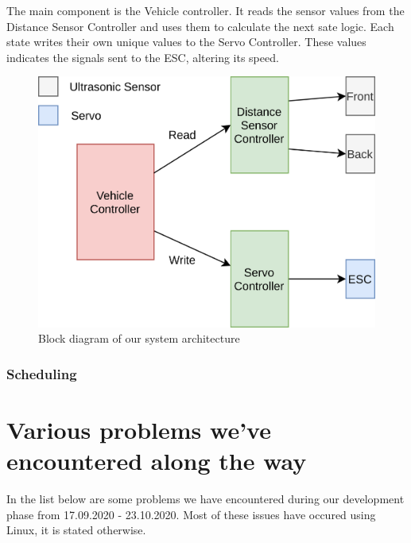 \documentclass{article}
\begin{document}
The main component is the Vehicle controller. It reads the sensor values from the Distance Sensor Controller and uses them to calculate the next sate logic. Each state writes their own unique values to the Servo Controller. These values indicates the signals sent to the ESC, altering its speed.

\begin{figure}[H]
	\centering
	\includegraphics[width=\linewidth]{system-architecture.png}
	\caption{Block diagram of our system architecture}
	\label{SystemArchBlock}
\end{figure}

\subsubsection{Scheduling}

\section{Various problems we've encountered along the way}
In the list below are some problems we have encountered during our development phase from 17.09.2020 - 23.10.2020. Most of these issues have occured using Linux, it is stated otherwise.
\end{document}
